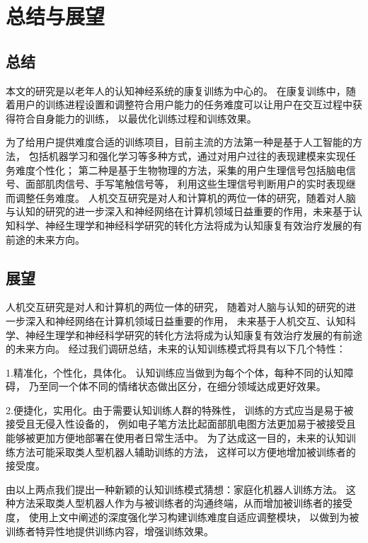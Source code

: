 \documentclass[12pt]{article}
\begin{document}
    \section{总结与展望}
    \subsection{总结}
    本文的研究是以老年人的认知神经系统的康复训练为中心的。
    在康复训练中，随着用户的训练进程设置和调整符合用户能力的任务难度可以让用户在交互过程中获得符合自身能力的训练，
    以最优化训练过程和训练效果。
    
    为了给用户提供难度合适的训练项目，目前主流的方法第一种是基于人工智能的方法，
    包括机器学习和强化学习等多种方式，通过对用户过往的表现建模来实现任务难度个性化；
    第二种是基于生物物理的方法，采集的用户生理信号包括脑电信号、面部肌肉信号、手写笔触信号等，
    利用这些生理信号判断用户的实时表现继而调整任务难度。
    人机交互研究是对人和计算机的两位一体的研究，随着对人脑与认知的研究的进一步深入和神经网络在计算机领域日益重要的作用，未来基于认知科学、神经生理学和神经科学研究的转化方法将成为认知康复有效治疗发展的有前途的未来方向。



    \subsection{展望}
    人机交互研究是对人和计算机的两位一体的研究，
    随着对人脑与认知的研究的进一步深入和神经网络在计算机领域日益重要的作用，
    未来基于人机交互、认知科学、神经生理学和神经科学研究的转化方法将成为认知康复有效治疗发展的有前途的未来方向。
    经过我们调研总结，未来的认知训练模式将具有以下几个特性：

    1.精准化，个性化，具体化。
    认知训练应当做到为每个个体，每种不同的认知障碍，
    乃至同一个体不同的情绪状态做出区分，在细分领域达成更好效果。

    2.便捷化，实用化。由于需要认知训练人群的特殊性，
    训练的方式应当是易于被接受且无侵入性设备的，
    例如电子笔方法比起面部肌电图方法更加易于被接受且能够被更加方便地部署在使用者日常生活中。
    为了达成这一目的，未来的认知训练方法可能采取类人型机器人辅助训练的方法，
    这样可以方便地增加被训练者的接受度。

    由以上两点我们提出一种新颖的认知训练模式猜想：家庭化机器人训练方法。
    这种方法采取类人型机器人作为与被训练者的沟通终端，从而增加被训练者的接受度，
    使用上文中阐述的深度强化学习构建训练难度自适应调整模块，
    以做到为被训练者特异性地提供训练内容，增强训练效果。
\end{document}
